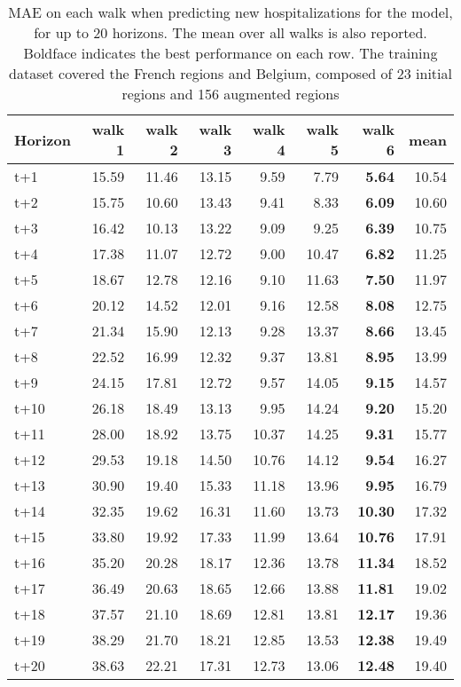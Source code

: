 \begin{table}[H]
\centering
\caption{MAE on each walk when predicting new hospitalizations for the model, for up to 20 horizons. The mean over all walks is also reported. Boldface indicates the best performance on each row. The training dataset covered the French regions and Belgium, composed of 23 initial regions and 156 augmented regions }
\label{tab:MAE_walk_encoder_decoder}
\begin{tabular}{lrrrrrrr}
\toprule
Horizon &  walk 1 &  walk 2 &  walk 3 &  walk 4 &  walk 5 &  walk 6 &  mean \\
\midrule
t+1  & 15.59  & 11.46  & 13.15  & 9.59  & 7.79  & \textbf{5.64}  & 10.54  \\
t+2  & 15.75  & 10.60  & 13.43  & 9.41  & 8.33  & \textbf{6.09}  & 10.60  \\
t+3  & 16.42  & 10.13  & 13.22  & 9.09  & 9.25  & \textbf{6.39}  & 10.75  \\
t+4  & 17.38  & 11.07  & 12.72  & 9.00  & 10.47  & \textbf{6.82}  & 11.25  \\
t+5  & 18.67  & 12.78  & 12.16  & 9.10  & 11.63  & \textbf{7.50}  & 11.97  \\
t+6  & 20.12  & 14.52  & 12.01  & 9.16  & 12.58  & \textbf{8.08}  & 12.75  \\
t+7  & 21.34  & 15.90  & 12.13  & 9.28  & 13.37  & \textbf{8.66}  & 13.45  \\
t+8  & 22.52  & 16.99  & 12.32  & 9.37  & 13.81  & \textbf{8.95}  & 13.99  \\
t+9  & 24.15  & 17.81  & 12.72  & 9.57  & 14.05  & \textbf{9.15}  & 14.57  \\
t+10  & 26.18  & 18.49  & 13.13  & 9.95  & 14.24  & \textbf{9.20}  & 15.20  \\
t+11  & 28.00  & 18.92  & 13.75  & 10.37  & 14.25  & \textbf{9.31}  & 15.77  \\
t+12  & 29.53  & 19.18  & 14.50  & 10.76  & 14.12  & \textbf{9.54}  & 16.27  \\
t+13  & 30.90  & 19.40  & 15.33  & 11.18  & 13.96  & \textbf{9.95}  & 16.79  \\
t+14  & 32.35  & 19.62  & 16.31  & 11.60  & 13.73  & \textbf{10.30}  & 17.32  \\
t+15  & 33.80  & 19.92  & 17.33  & 11.99  & 13.64  & \textbf{10.76}  & 17.91  \\
t+16  & 35.20  & 20.28  & 18.17  & 12.36  & 13.78  & \textbf{11.34}  & 18.52  \\
t+17  & 36.49  & 20.63  & 18.65  & 12.66  & 13.88  & \textbf{11.81}  & 19.02  \\
t+18  & 37.57  & 21.10  & 18.69  & 12.81  & 13.81  & \textbf{12.17}  & 19.36  \\
t+19  & 38.29  & 21.70  & 18.21  & 12.85  & 13.53  & \textbf{12.38}  & 19.49  \\
t+20  & 38.63  & 22.21  & 17.31  & 12.73  & 13.06  & \textbf{12.48}  & 19.40  \\

\bottomrule
\end{tabular}
\end{table}
